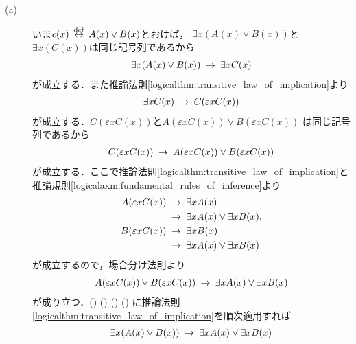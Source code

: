 	\begin{prf}\mbox{}
		\begin{description}
			\item[(a)]
				いま$c(x) \overset{\mathrm{def}}{\hspace{0.25em}\leftrightarrow\hspace{0.25em}} A(x) \vee B(x)$とおけば，
				$\exists x ( A(x) \vee B(x) )$と$\exists x ( C(x) )$は同じ記号列であるから
				\begin{align}
					\exists x ( A(x) \vee B(x) ) \hspace{0.25em}\rightarrow\hspace{0.25em} \exists x C(x)
					\label{eq:logicalthm_properties_of_quantifiers_1}
				\end{align}
				が成立する．また推論法則\ref{logicalthm:transitive_law_of_implication}より
				\begin{align}
					\exists x C(x) \hspace{0.25em}\rightarrow\hspace{0.25em} C(\varepsilon x C(x))
					\label{eq:logicalthm_properties_of_quantifiers_2}
				\end{align}
				が成立する．$C(\varepsilon x C(x))$と$A(\varepsilon x C(x)) \vee B(\varepsilon x C(x))$
				は同じ記号列であるから
				\begin{align}
					C(\varepsilon x C(x)) \hspace{0.25em}\rightarrow\hspace{0.25em} A(\varepsilon x C(x)) \vee B(\varepsilon x C(x))
					\label{eq:logicalthm_properties_of_quantifiers_3}
				\end{align}
				が成立する．ここで推論法則\ref{logicalthm:transitive_law_of_implication}と
				推論規則\ref{logicalaxm:fundamental_rules_of_inference}より
				\begin{align}
					A(\varepsilon x C(x)) &\hspace{0.25em}\rightarrow\hspace{0.25em} \exists x A(x) \\
						&\hspace{0.25em}\rightarrow\hspace{0.25em} \exists x A(x) \vee \exists x B(x), \\
					B(\varepsilon x C(x)) &\hspace{0.25em}\rightarrow\hspace{0.25em} \exists x B(x) \\
						&\hspace{0.25em}\rightarrow\hspace{0.25em} \exists x A(x) \vee \exists x B(x)
				\end{align}
				が成立するので，場合分け法則より
				\begin{align}
					A(\varepsilon x C(x)) \vee B(\varepsilon x C(x))
					\hspace{0.25em}\rightarrow\hspace{0.25em} \exists x A(x) \vee \exists x B(x)
					\label{eq:logicalthm_properties_of_quantifiers_4}
				\end{align}
				が成り立つ．()
				()
				()
				()
				に推論法則\ref{logicalthm:transitive_law_of_implication}を順次適用すれば
				\begin{align}
					\exists x ( A(x) \vee B(x) ) \hspace{0.25em}\rightarrow\hspace{0.25em} \exists x A(x) \vee \exists x B(x)
				\end{align}

\end{description}
\end{prf}
